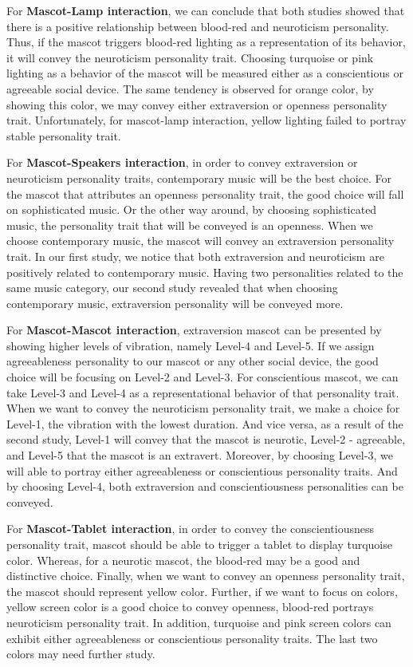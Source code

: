 \par For \textbf{Mascot-Lamp interaction}, we can conclude that both studies showed that
there is a positive relationship between blood-red and neuroticism personality.
Thus, if the mascot triggers blood-red lighting as a representation of its behavior,
it will convey the neuroticism personality trait.
Choosing turquoise or pink lighting as a behavior of the
mascot will be measured either as a conscientious or agreeable social device.
The same tendency is observed for orange color, by showing this color, we may convey
either extraversion or openness personality trait.
Unfortunately, for mascot-lamp interaction, yellow lighting failed to portray stable personality trait.

\par For \textbf{Mascot-Speakers interaction}, in order to convey extraversion or neuroticism personality traits,
contemporary music will be the best choice.
For the mascot that attributes an openness personality trait,
the good choice will fall on sophisticated music.
Or the other way around, by choosing sophisticated music, the personality trait that
will be conveyed is an openness.
When we choose contemporary music, the mascot will convey an extraversion personality trait.
In our first study, we notice that both extraversion and neuroticism are positively related to contemporary music.
Having two personalities related to the same music category, our second study
revealed that when choosing contemporary music, extraversion personality will be conveyed more.

\par For \textbf{Mascot-Mascot interaction}, extraversion mascot can be presented by
showing higher levels of vibration, namely Level-4 and Level-5.
If we assign agreeableness personality to our mascot or any other social device,
the good choice will be focusing on Level-2 and Level-3.
For conscientious mascot, we can take Level-3 and Level-4 as a representational behavior of that personality trait.
When we want to convey the neuroticism personality trait, we make a choice for Level-1,
the vibration with the lowest duration.
And vice versa, as a result of the second study, Level-1 will convey that the mascot
is neurotic, Level-2 - agreeable, and Level-5 that the mascot is an extravert.
Moreover, by choosing Level-3, we will able to portray either agreeableness or conscientious personality traits.
And by choosing Level-4, both extraversion and conscientiousness personalities can be conveyed.

\par For \textbf{Mascot-Tablet interaction}, in order to convey the conscientiousness personality trait,
mascot should be able to trigger a tablet to display turquoise color.
Whereas, for a neurotic mascot, the blood-red may be a good and distinctive choice.
Finally, when we want to convey an openness personality trait, the mascot should represent yellow color.
Further, if we want to focus on colors, yellow screen color is a good choice to convey openness,
blood-red portrays neuroticism personality trait.
In addition, turquoise and pink screen colors can exhibit either agreeableness or
conscientious personality traits.
The last two colors may need further study.


